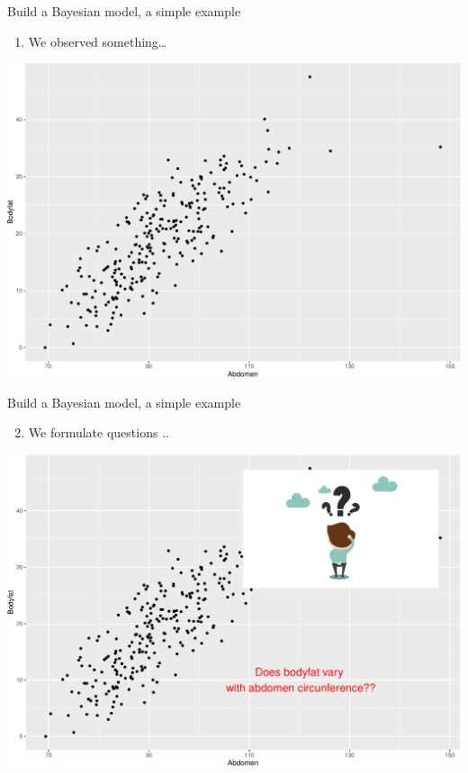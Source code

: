\documentclass[
  ignorenonframetext,
]{beamer}
\providecommand{\tightlist}{%
  \setlength{\itemsep}{0pt}\setlength{\parskip}{0pt}}
\begin{document}
\begin{frame}{Build a Bayesian model, a simple example}
\protect\hypertarget{build-a-bayesian-model-a-simple-example}{}
\begin{enumerate}
\tightlist
\item
  We observed something\ldots{}
\end{enumerate}

\begin{center}\includegraphics[width=0.9\linewidth]{Part1_intro_files/figure-beamer/unnamed-chunk-2-1} \end{center}
\end{frame}

\begin{frame}{Build a Bayesian model, a simple example}
\protect\hypertarget{build-a-bayesian-model-a-simple-example-1}{}
\begin{enumerate}
\setcounter{enumi}{1}
\tightlist
\item
  We formulate questions ..
\end{enumerate}

\begin{center}\includegraphics[width=0.6\linewidth]{Part1_intro_files/figure-beamer/unnamed-chunk-3-1} \end{center}
\end{frame}
\end{document}
